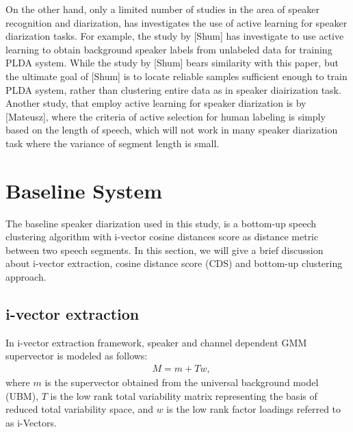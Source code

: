 \documentclass[journal]{IEEEtran}
\begin{document}
On the other hand, only a limited number of studies in the area of speaker recognition and diarization, has investigates the use of active learning for speaker diarization tasks. For example, the study by [Shum] has investigate to use active learning to obtain background speaker labels from unlabeled data for training PLDA system. While the study by [Shum] bears similarity with this paper, but the ultimate goal of [Shum] is to locate reliable samples sufficient enough to train PLDA system, rather than clustering entire data as in speaker diairization task. Another study, that employ active learning for speaker diarization is by [Mateusz], where the criteria of active selection for human labeling is simply based on the length of speech, which will not work in many speaker diarization task where the variance of segment length is small.

\section{Baseline System}
The baseline speaker diarization used in this study, is a bottom-up speech clustering algorithm with i-vector cosine distances score as distance metric between two speech segments. In this section, we will give a brief discussion about i-vector extraction, cosine distance score (CDS) and bottom-up clustering approach. 

\subsection{i-vector extraction}
In i-vector extraction framework, speaker and channel dependent GMM supervector is modeled as follows:
\begin{equation}
\begin{aligned}
& M=m+Tw,
\label{mmtw}
\end{aligned}
\end{equation}
where $m$ is the supervector obtained from the universal background model (UBM), 
$T$ is the low rank total variability matrix representing the basis of reduced total variability space, 
and $w$ is the low rank factor loadings referred to as i-Vectors. 
\end{document}
